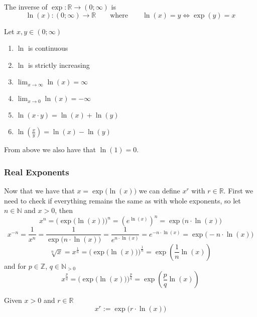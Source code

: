 \begin{definition}[Logarithm]
   The inverse of \(\exp: \mathbb{R} \to (0; \infty)\) is
   \[\ln(x): (0; \infty) \to \mathbb{R} \qquad\text{where}\qquad \ln(x) = y \iff \exp(y) = x\]
\end{definition}

\begin{proposition}[Properties]
   Let \(x, y \in (0; \infty)\)
   \begin{enumerate}[label=\roman*, align=Center]
      \item \(\ln\) is continuous
      \item \(\ln\) is strictly increasing
      \item \(\lim_{x \to \infty} \ln(x) = \infty\)
      \item \(\lim_{x \to 0} \ln(x) = -\infty\)
      \item \(\ln(x \cdot y) = \ln(x) + \ln(y)\)
      \item \(\ln\left(\frac{x}{y}\right) = \ln(x) - \ln(y)\)
   \end{enumerate}
\end{proposition}
\begin{remark}
   From above we also have that \(\ln(1) = 0\).
\end{remark}

\subsubsection{Real Exponents}
Now that we have that \(x = \exp\big(\ln(x)\big)\) we can define \(x^r\) with \(r \in \mathbb{R}\).
First we need to check if everything remains the same as with whole exponents, so let \(n \in \mathbb{N}\) and \(x > 0\), then
\[x^n = \Big(\exp\big(\ln(x)\big)\Big)^n = \left(e^{\ln(x)}\right)^n = \exp\big(n \cdot \ln(x)\big)\]
\[x^{-n} = \frac{1}{x^n} = \frac{1}{\exp\big(n \cdot \ln(x)\big)} = \frac{1}{e^{n \cdot \ln(x)}} = e^{-n \cdot \ln(x)} = \exp\big(-n \cdot \ln(x)\big)\]
\[\sqrt[n]{x} = x^{\frac{1}{n}} = \Big(\exp\big(\ln(x)\big)\Big)^\frac{1}{n} = \exp\left(\frac{1}{n} \ln(x)\right)\]
and for \(p \in \mathbb{Z}\), \(q \in \mathbb{N}_{>0}\)
\[x^\frac{p}{q} = \Big(\exp\big(\ln(x)\big)\Big)^\frac{p}{q} = \exp\left(\frac{p}{q} \ln(x)\right)\]

\begin{definition}
   Given \(x > 0\) and \(r \in \mathbb{R}\)
   \[x^r := \exp\big(r \cdot \ln(x)\big)\]
\end{definition}

